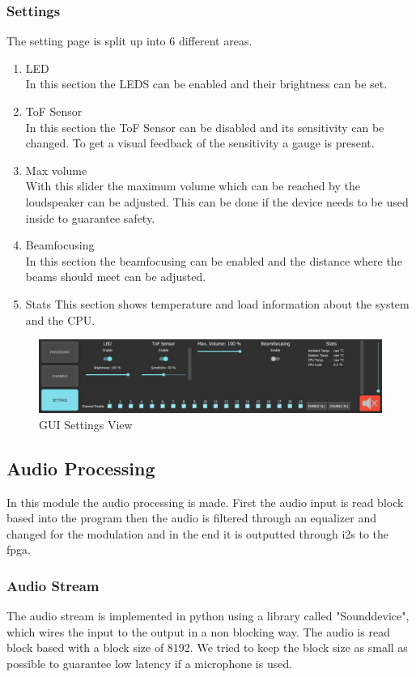 \subsubsection{Settings}
The setting page is split up into 6 different areas.
\begin{enumerate}
    \item LED \\
    In this section the LEDS can be enabled and their brightness can be set. 
    \item ToF Sensor \\
    In this section the ToF Sensor can be disabled and its sensitivity can be changed. To get a visual feedback of the sensitivity a gauge is present.
    \item Max volume \\
    With this slider the maximum volume which can be reached by the loudspeaker can be adjusted. This can be done if the device needs to be used inside to guarantee safety.  
    \item Beamfocusing \\ 
    In this section the beamfocusing can be enabled and the distance where the beams should meet can be adjusted. 
    \item Stats
    This section shows temperature and load information about the system and the CPU.
\end{enumerate}
\begin{figure}[h!]
    \centering
    \includegraphics[width=\textwidth]{images/4_Design/GUI_Settings.JPG}
    \caption{GUI Settings View}
    \label{4_fig:gui_settings}
\end{figure}

\subsection{Audio Processing}
In this module the audio processing is made. First the audio input is read block based into the program then the audio is filtered through an equalizer and changed for the modulation and in the end it is outputted through \acrshort{i2s} to the \acrshort{fpga}.
\subsubsection{Audio Stream}
The audio stream is implemented in python using a library called "Sounddevice", which wires the input to the output in a non blocking way. The audio is read block based with a block size of 8192. We tried to keep the block size as small as possible to guarantee low latency if a microphone is used. 
